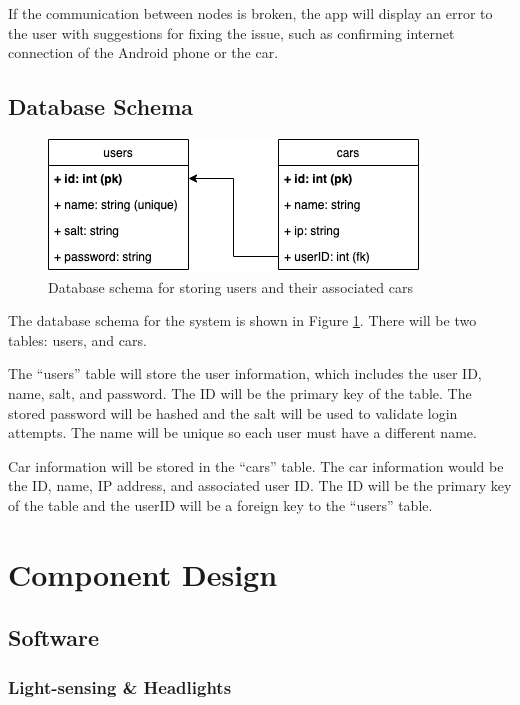 \documentclass[letterpaper,12pt]{report}
\begin{document}
    If the communication between nodes is broken, the app will display an error
    to the user with suggestions for fixing the issue, such as confirming
    internet connection of the Android phone or the car.

    \subsection{Database Schema}

    \begin{figure}[H]
        \centering
        \includegraphics[width=0.7\linewidth]{diagrams/Design_Database_Schema.png}
        \caption{Database schema for storing users and their associated cars}
        \label{fig:database}
    \end{figure}

    The database schema for the system is shown in Figure \ref{fig:database}.
    There will be two tables: users, and cars.

    The “users” table will store the user information, which includes the
    user ID, name, salt, and password. The ID will be the primary key of the
    table. The stored password will be hashed and the salt will be used to
    validate login attempts. The name will be unique so each user must have a
    different name.

    Car information will be stored in the “cars” table. The car information
    would be the ID, name, IP address, and associated user ID. The ID will be
    the primary key of the table and the userID will be a foreign key to the
    “users” table.

    \section{Component Design}

    \subsection{Software}

    \subsubsection{Light-sensing \& Headlights}
\end{document}
